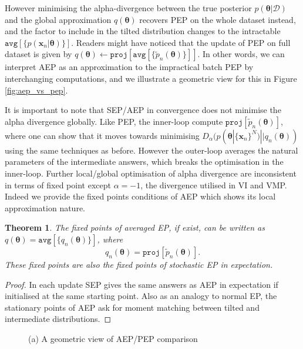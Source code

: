 \documentclass{article} %
\newtheorem{theorem}{Theorem}
\begin{document}
However minimising the alpha-divergence between the true posterior $p(\bm{\theta}|\mathcal{D})$ and the global approximation $q(\bm{\theta})$ recovers PEP on the whole dataset instead, and the factor to include in the tilted distribution changes to the intractable $\mathtt{avg}[\{p(\bm{x}_n | \bm{\theta}) \}]$. Readers might have noticed that the update of PEP on full dataset is given by $q(\bm{\theta}) \leftarrow \mathtt{proj}[\mathtt{avg}[\{ \tilde{p}_n(\bm{\theta}) \}]]$. In other words, we can interpret AEP as an approximation to the impractical batch PEP by interchanging computations, and we illustrate a geometric view for this in Figure \ref{fig:aep_vs_pep}.

It is important to note that SEP/AEP in convergence does not minimise the alpha divergence globally. Like PEP, the inner-loop compute $\mathtt{proj}[\tilde{p}_n(\bm{\theta})]$, where one can show that it moves towards minimising $D_{\alpha}(p(\bm{\theta} | \{\bm{x}_n\}^N) || q_n(\bm{\theta}))$ using the same techniques as before. However the outer-loop averages the natural parameters of the intermediate answers, which breaks the optimisation in the inner-loop. Further local/global optimisation of alpha divergence are inconsistent in terms of fixed point except $\alpha = -1$, the divergence utilised in VI and VMP. Indeed we provide the fixed points conditions of AEP which shows its local approximation nature.
%
\begin{theorem}
The fixed points of averaged EP, if exist, can be written as $q(\bm{\theta}) = \mathtt{avg}[\{q_n(\bm{\theta})\}]$, where
\begin{equation}
q_n(\bm{\theta}) = \mathtt{proj}[\tilde{p}_n(\bm{\theta})].
\label{eq:mm}
\end{equation}
These fixed points are also the fixed points of stochastic EP in expectation. 
\end{theorem}
\begin{proof}
In each update SEP gives the same answers as AEP in expectation if initialised at the same starting point. Also as an analogy to normal EP, the stationary points of AEP ask for moment matching between tilted and intermediate distributions. 
\end{proof}
%

\begin{figure}
\centering
\def\svgwidth{0.35\linewidth}
\subfigure[\label{fig:aep_vs_pep}]{
}
%
\caption{(a) A geometric view of AEP/PEP comparison}
\end{figure}
\end{document}
